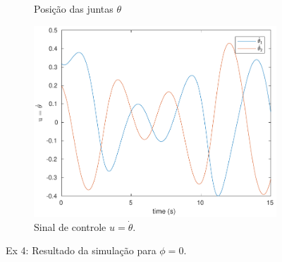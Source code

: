 \documentclass[a4paper,11pt]{article}
\theoremstyle{mytheor}
\begin{document}
\begin{figure}[ht]
\begin{minipage}{\linewidth}
\begin{subfigure}[b]{0.49\textwidth}
    \caption{Posição das juntas $\theta$}
    \label{fig:ex3_1_q}
    \end{subfigure}
    \begin{subfigure}[b]{0.49\textwidth}
    \includegraphics[width=1\textwidth]{figs/ex3_1_dq.pdf}
    \caption{Sinal de controle $u = \dot{\theta}$.}
    \label{fig:ex3_1_dq}
    \end{subfigure}
  \end{minipage}
\caption{Ex 4: Resultado da simulação para $\phi = 0$.}
\label{fig:ex3_1}
\end{figure}
\end{document}
